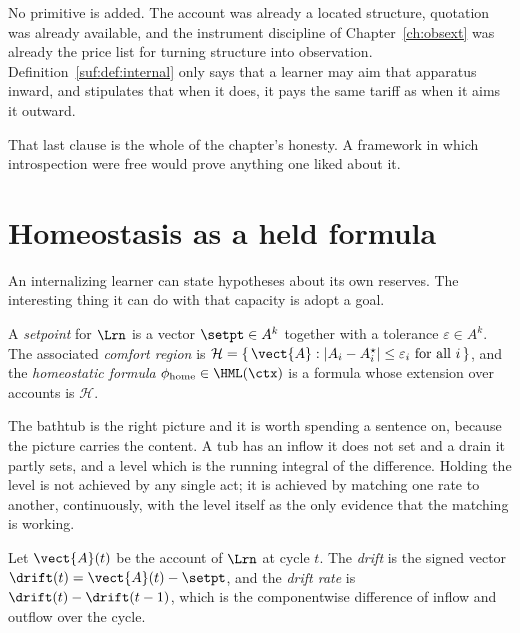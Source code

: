 \begin{remark}
\label{suf:rem:notnew}
No primitive is added.
The account was already a located structure, quotation was already
available, and the instrument discipline of Chapter~\ref{ch:obsext} was
already the price list for turning structure into observation.
Definition~\ref{suf:def:internal} only says that a learner may aim that
apparatus inward, and stipulates that when it does, it pays the same
tariff as when it aims it outward.

That last clause is the whole of the chapter's honesty.
A framework in which introspection were free would prove anything one
liked about it.
\end{remark}

\section{Homeostasis as a held formula}
\label{suf:S2}

An internalizing learner can state hypotheses about its own reserves.
The interesting thing it can do with that capacity is adopt a goal.

\begin{definition}
\label{suf:def:setpoint}
A \emph{setpoint} for $\Lrn$ is a vector $\setpt \in A^k$ together with a
tolerance $\varepsilon \in A^k$.
The associated \emph{comfort region} is
$\mathcal{H} = \{\, \vect{A} : |A_i - A^\star_i| \leq \varepsilon_i
\text{ for all } i \,\}$,
and the \emph{homeostatic formula} $\phi_{\mathrm{home}} \in \HML(\ctx)$
is a formula whose extension over accounts is $\mathcal{H}$.
\end{definition}

The bathtub is the right picture and it is worth spending a sentence on,
because the picture carries the content.
A tub has an inflow it does not set and a drain it partly sets, and a
level which is the running integral of the difference.
Holding the level is not achieved by any single act; it is achieved by
matching one rate to another, continuously, with the level itself as the
only evidence that the matching is working.

\begin{definition}[Drift]
\label{suf:def:drift}
Let $\vect{A}(t)$ be the account of $\Lrn$ at cycle $t$.
The \emph{drift} is the signed vector
$\drift(t) = \vect{A}(t) - \setpt$,
and the \emph{drift rate} is $\drift(t) - \drift(t-1)$, which is the
componentwise difference of inflow and outflow over the cycle.
\end{definition}

